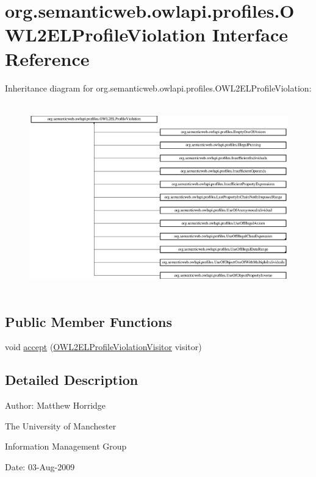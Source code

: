 \hypertarget{interfaceorg_1_1semanticweb_1_1owlapi_1_1profiles_1_1_o_w_l2_e_l_profile_violation}{\section{org.\-semanticweb.\-owlapi.\-profiles.\-O\-W\-L2\-E\-L\-Profile\-Violation Interface Reference}
\label{interfaceorg_1_1semanticweb_1_1owlapi_1_1profiles_1_1_o_w_l2_e_l_profile_violation}
}
Inheritance diagram for org.\-semanticweb.\-owlapi.\-profiles.\-O\-W\-L2\-E\-L\-Profile\-Violation\-:\begin{figure}[H]
\begin{center}
\leavevmode
\includegraphics[height=8.216704cm]{interfaceorg_1_1semanticweb_1_1owlapi_1_1profiles_1_1_o_w_l2_e_l_profile_violation}
\end{center}
\end{figure}
\subsection*{Public Member Functions}
\begin{DoxyCompactItemize}
\item 
void \hyperlink{interfaceorg_1_1semanticweb_1_1owlapi_1_1profiles_1_1_o_w_l2_e_l_profile_violation_a61a0b551e643445b3953b1e98fb57cfd}{accept} (\hyperlink{interfaceorg_1_1semanticweb_1_1owlapi_1_1profiles_1_1_o_w_l2_e_l_profile_violation_visitor}{O\-W\-L2\-E\-L\-Profile\-Violation\-Visitor} visitor)
\end{DoxyCompactItemize}


\subsection{Detailed Description}
Author\-: Matthew Horridge\par
 The University of Manchester\par
 Information Management Group\par
 Date\-: 03-\/\-Aug-\/2009 

